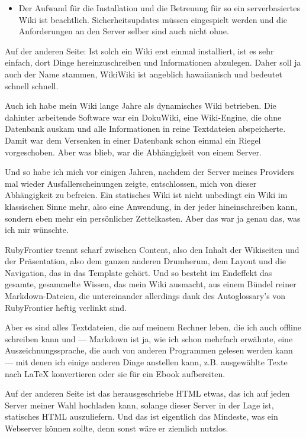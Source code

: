 \documentclass[11pt]{report}
\begin{document}
\begin{itemize}
\item Der Aufwand für die Installation und die Betreuung für so ein
  serverbasiertes Wiki ist beachtlich. Sicherheitsupdates müssen
  eingespielt werden und die Anforderungen an den Server selber sind
  auch nicht ohne.
\end{itemize}

Auf der anderen Seite: Ist solch ein Wiki erst einmal installiert, ist
es sehr einfach, dort Dinge hereinzuschreiben und Informationen
abzulegen. Daher soll ja auch der Name stammen, WikiWiki ist angeblich
hawaiianisch und bedeutet schnell schnell.


Auch ich habe mein Wiki lange Jahre als dynamisches Wiki
betrieben. Die dahinter arbeitende Software war ein DokuWiki, eine
Wiki-Engine, die ohne Datenbank auskam und alle Informationen in reine
Textdateien abspeicherte. Damit war dem Versenken in einer Datenbank
schon einmal ein Riegel vorgeschoben. Aber was blieb, war die
Abhängigkeit von einem Server.


Und so habe ich mich vor einigen Jahren, nachdem der Server meines
Providers mal wieder Ausfallerscheinungen zeigte, entschlossen, mich
von dieser Abhängigkeit zu befreien. Ein statisches Wiki ist nicht
unbedingt ein Wiki im klassischen Sinne mehr, also eine Anwendung, in
der jeder hineinschreiben kann, sondern eben mehr ein persönlicher
Zettelkasten. Aber das war ja genau das, was ich mir wünschte.


RubyFrontier trennt scharf zwischen Content, also den Inhalt der
Wikiseiten und der Präsentation, also dem ganzen anderen Drumherum,
dem Layout und die Navigation, das in das Template gehört. Und so
besteht im Endeffekt das gesamte, gesammelte Wissen, das mein Wiki
ausmacht, aus einem Bündel reiner Markdown-Dateien, die untereinander
allerdings dank des Autoglossary’s von RubyFrontier heftig verlinkt
sind.


Aber es sind alles Textdateien, die auf meinem Rechner leben, die ich
auch offline schreiben kann und — Markdown ist ja, wie ich schon
mehrfach erwähnte, eine Auszeichnungssprache, die auch von anderen
Programmen gelesen werden kann — mit denen ich einige anderen Dinge
anstellen kann, z.B. ausgewählte Texte nach \LaTeX{} konvertieren oder
sie für ein Ebook aufbereiten.


Auf der anderen Seite ist das herausgeschriebe HTML etwas, das ich auf
jeden Server meiner Wahl hochladen kann, solange dieser Server in der
Lage ist, statisches HTML auszuliefern. Und das ist eigentlich das
Mindeste, was ein Webserver können sollte, denn sonst wäre er ziemlich
nutzlos.
\end{document}
